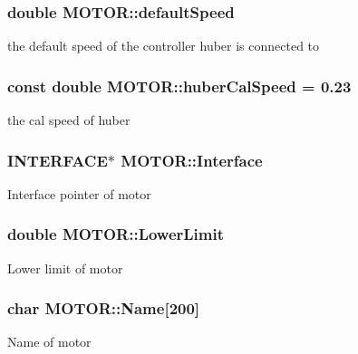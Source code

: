 \subsubsection{\setlength{\rightskip}{0pt plus 5cm}double \bf{MOTOR::default\-Speed}\hspace{0.3cm}{\tt  [static]}}\label{classMOTOR_dbc17ab26b84f9076d2159acf5a7706d}


the default speed of the controller huber is connected to 
\subsubsection{\setlength{\rightskip}{0pt plus 5cm}const double \bf{MOTOR::huber\-Cal\-Speed} = 0.23\hspace{0.3cm}{\tt  [static]}}\label{classMOTOR_ddb6cf4eb0aa38324139d4e64be1fbde}


the cal speed of huber 
\subsubsection{\setlength{\rightskip}{0pt plus 5cm}\bf{INTERFACE}$\ast$ \bf{MOTOR::Interface}\hspace{0.3cm}{\tt  [private]}}\label{classMOTOR_395919933b348e81052909f3c95ddb24}


Interface pointer of motor 
\subsubsection{\setlength{\rightskip}{0pt plus 5cm}double \bf{MOTOR::Lower\-Limit}\hspace{0.3cm}{\tt  [private]}}\label{classMOTOR_4ea02020a6051a6eeb798e2f51b9e861}


Lower limit of motor 
\subsubsection{\setlength{\rightskip}{0pt plus 5cm}char \bf{MOTOR::Name}[200]\hspace{0.3cm}{\tt  [private]}}\label{classMOTOR_126941ca87bef2fd0e6489c2a61a6305}


Name of motor 

